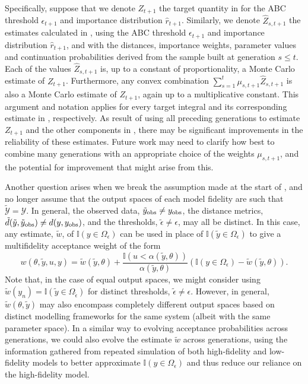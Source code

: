 \documentclass[review]{siamonline190516}
\begin{document}
Specifically, suppose that we denote $Z_{t+1}$ the target quantity in  for the ABC threshold $\epsilon_{t+1}$ and importance distribution $\hat r_{t+1}$.
Similarly, we denote $\hat Z_{s, t+1}$ the estimates calculated in , using the ABC threshold $\epsilon_{t+1}$ and importance distribution $\hat r_{t+1}$, and with the distances, importance weights, parameter values and continuation probabilities derived from the sample built at generation $s \leq t$.
Each of the values $\hat Z_{s, t+1}$ is, up to a constant of proportionality, a Monte Carlo estimate of $Z_{t+1}$.
Furthermore, any convex combination $\sum_{s=1}^{t} \mu_{s, t+1} \hat Z_{s, t+1}$ is also a Monte Carlo estimate of $Z_{t+1}$, again up to a multiplicative constant.
This argument and notation applies for every target integral and its corresponding estimate in , respectively.
As result of using all preceding generations to estimate $Z_{t+1}$ and the other components in , there may be significant improvements in the reliability of these estimates.
Future work may need to clarify how best to combine many generations with an appropriate choice of the weights $\mu_{s,t+1}$, and the potential for improvement that might arise from this.


Another question arises when we break the assumption made at the start of , and no longer assume that the output spaces of each model fidelity are such that $\tilde{\mathcal Y} = \mathcal Y$.
In general, the observed data, $\tilde y_{\mathrm{obs}} \neq y_{\mathrm{obs}}$, the distance metrics, $\tilde d(\tilde y, \tilde y_{\mathrm{obs}}) \neq d(y,y_{\mathrm{obs}})$, and the thresholds, $\tilde \epsilon \neq \epsilon$, may all be distinct.
In this case, any estimate, $\tilde w$, of $\mathbb I(y \in \Omega_\epsilon)$ can be used in place of $\mathbb I(\tilde y \in \Omega_\epsilon)$ to give a multifidelity acceptance weight of the form
\[
 w(\theta, \tilde y, u, y) = \tilde w(\tilde y, \theta) + \frac{\mathbb I(u<\alpha(\tilde y, \theta))}{\alpha(\tilde y, \theta)} \left( \mathbb I(y \in \Omega_\epsilon) - \tilde w(\tilde y, \theta) \right).
\]
Note that, in the case of equal output spaces, we might consider using $\tilde w(y_n) = \mathbb I(\tilde y \in \Omega_{\tilde \epsilon})$ for distinct thresholds, $\tilde \epsilon \neq \epsilon$.
However, in general, $\tilde w(\theta, \tilde y)$ may also encompass completely different output spaces based on distinct modelling frameworks for the same system (albeit with the same parameter space).
In a similar way to evolving acceptance probabilities across generations, we could also evolve the estimate $\tilde w$ across generations, using the information gathered from repeated simulation of both high-fidelity and low-fidelity models to better approximate $\mathbb I(y \in \Omega_\epsilon)$ and thus reduce our reliance on the high-fidelity model.
\end{document}
